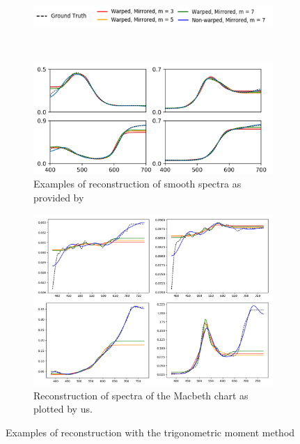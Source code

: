 \begin{figure}[t]
	\centering
	\begin{subfigure}[t]{0.70\textwidth}
		\includegraphics[width=\linewidth]{img/moments_reconstruction_legend.png}
	\end{subfigure} \\
	\vspace{1em}
	\begin{subfigure}[t]{0.45\textwidth}
		\includegraphics[width=\linewidth,height=0.2\textheight]{img/moments_reconstruction_Peters.png}
		\caption{Examples of reconstruction of smooth spectra as provided by~\citet{trigonometricMomentsPaper}}
		\label{fig:momentsReconstructionPeters}
	\end{subfigure} \hspace{0.1em}
	\begin{subfigure}[t]{0.45\textwidth}
		\includegraphics[width=\linewidth]{img/moments_reconstruction_ours.png}
		\caption{Reconstruction of spectra of the Macbeth chart as plotted by us.}
		\label{fig:momentsReconstructionOur}
	\end{subfigure}
	\caption{Examples of reconstruction with the trigonometric moment method}
	\label{fig:momentsReconstructionComparison}
\end{figure}


